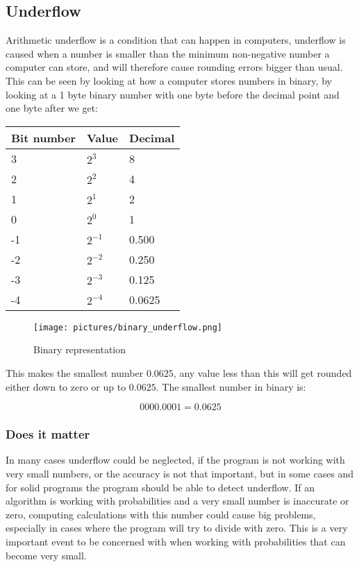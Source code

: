\subsection{Underflow}
    Arithmetic underflow is a condition that can happen in computers, underflow is caused when a number is smaller than the minimum non-negative number a computer can store, and will therefore cause rounding errors bigger than usual. This can be seen by looking at how a computer stores numbers in binary, by looking at a 1 byte binary number with one byte before the decimal point and one byte after we get:\\

\begin{table}[!h]
    \begin{tabular}{|l|l|l|}
        \hline
        Bit number & Value    & Decimal \\ \hline
        3          & $2^3$    & 8       \\ 
        2          & $2^2$    & 4       \\ 
        1          & $2^1$    & 2       \\ 
        0          & $2^0$    & 1       \\ 
        -1         & $2^{-1}$ & 0.500   \\ 
        -2         & $2^{-2}$ & 0.250   \\ 
        -3         & $2^{-3}$ & 0.125   \\ 
        -4         & $2^{-4}$ & 0.0625  \\
        \hline
    \end{tabular}
\end{table}

	\begin{figure}
		\centering
		\texttt{[image: pictures/binary\_underflow.png]}
		\caption{Binary representation}
		\label{fig:binary_underflow}
	\end{figure}


    This makes the smallest number $0.0625$, any value less than this will get rounded either down to zero or up to $0.0625$. The smallest number in binary is:

    $$0000.0001 = 0.0625$$

\subsubsection{Does it matter}
In many cases underflow could be neglected, if the program is not working with very small numbers, or the accuracy is not that important, but in some cases and for solid programs the program should be able to detect underflow. If an algorithm is working with probabilities and a very small number is inaccurate or zero, computing calculations with this number could cause big problems, especially in cases where the program will try to divide with zero. This is a very important event to be concerned with when working with probabilities that can become very small.  

